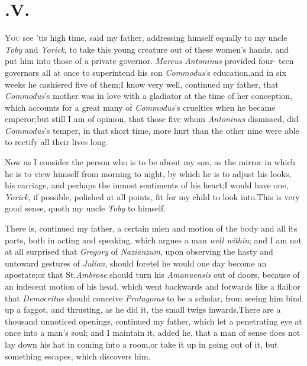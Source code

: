 \documentclass{article}
\begin{document}
\vskip -6pt
\enlargethispage\baselineskip

\section{.\enspace V.}

\lettrine{Y}{ou} see ’tis high time, said my
father, addressing himself equally to my uncle \textit{Toby} and
\textit{Yorick}, to take this young creature out of these
women’s hands, and put him into those of a private governor.
\textit{Marcus Antoninus} provided four- teen governors all at once to
superintend his son \textit{Commodus}’s education,\tsk and in
six weeks he cashiered five of them;\tsk \break I know very well,
continued my father, that \textit{Commodus}’s mother was in
love with a gladiator at the time of her conception, which accounts
for a great many of \textit{Commodus}’s cruelties when he
became emperor;\tsk but still I am of opinion, that those five
whom \textit{Antoninus} dismissed, did \textit{Commodus}’s
temper, in that short time, more hurt than the other nine were able
to rectify all their lives long.

Now as I consider the person who is to be about my son, as the
mirror in which he is to view himself from morning to night,
by which he is to adjust his looks, his carriage, and perhaps the
inmost sentiments of his heart;\tsk I would have one,
\textit{Yorick}, if possible, polished at all points, fit for my
child to look into.\break\tsh This is very good sense, quoth my
uncle \textit{Toby} to himself.

\tsh There is, continued my father, a certain mien and
motion of the body and all its parts, both in acting and speaking,
which argues a man \textit{well within}; and I am not at all
surprised that \textit{Gregory} of \textit{Nazianzum}, upon observing
the hasty and untoward gestures of \textit{Julian}, should foretel he
would one day become an apostate;\tsh or that St.\@ \textit{Ambrose} should turn his \textit{Amanuensis} out of doors,
because of an indecent motion of his head, which went backwards and
forwards like a flail;\tsh or that \textit{Democritus}
should conceive \textit{Protagoras} to be a scholar, from seeing him
bind up a faggot, and thrusting, as he did it, the small twigs
inwards.\tsh There are a thousand unnoticed openings,
continued my father, which let a penetrating eye at once into
a man’s soul; and I maintain it, added he, that a man of
sense does not lay down his hat in coming into a room,\tsk or
take it up in going out of it, but something escapes, which
discovers him.
\end{document}
